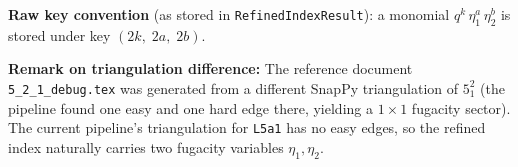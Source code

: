 \documentclass[12pt]{article}
\begin{document}
\noindent\textbf{Raw key convention} (as stored in \texttt{RefinedIndexResult}):
a monomial $q^k\,\eta_1^a\,\eta_2^b$ is stored under key $(2k,\; 2a,\; 2b)$.

\bigskip
\noindent\textbf{Remark on triangulation difference:}
The reference document \texttt{5\_2\_1\_debug.tex} was generated from a different SnapPy
triangulation of $5^2_1$ (the pipeline found one easy and one hard edge there,
yielding a $1 \times 1$ fugacity sector).
The current pipeline's triangulation for \texttt{L5a1} has no easy edges,
so the refined index naturally carries two fugacity variables $\eta_1, \eta_2$.
\end{document}
